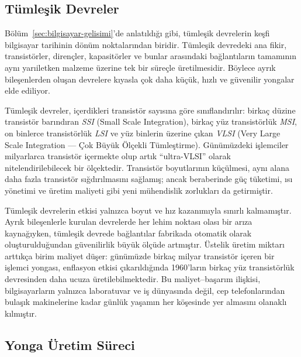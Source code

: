 \subsection{Tümleşik Devreler}
\label{sec:tumlesik-devreler}
Bölüm~\ref{sec:bilgisayar-gelisimi}'de anlatıldığı gibi, tümleşik devrelerin keşfi bilgisayar tarihinin dönüm noktalarından biridir. Tümleşik devredeki ana fikir, transistörler, dirençler, kapasitörler ve bunlar arasındaki bağlantıların tamamının aynı yarıiletken malzeme üzerine tek bir süreçle üretilmesidir. Böylece ayrık bileşenlerden oluşan devrelere kıyasla çok daha küçük, hızlı ve güvenilir yongalar elde ediliyor.

Tümleşik devreler, içerdikleri transistör sayısına göre sınıflandırılır: birkaç düzine transistör barındıran \emph{SSI} (Small Scale Integration), birkaç yüz transistörlük \emph{MSI}, on binlerce transistörlük \emph{LSI} ve yüz binlerin üzerine çıkan \emph{VLSI} (Very Large Scale Integration --- Çok Büyük Ölçekli Tümleştirme). Günümüzdeki işlemciler milyarlarca transistör içermekte olup artık ``ultra-VLSI'' olarak nitelendirilebilecek bir ölçektedir. Transistör boyutlarının küçülmesi, aynı alana daha fazla transistör sığdırılmasını sağlamış; ancak beraberinde güç tüketimi, ısı yönetimi ve üretim maliyeti gibi yeni mühendislik zorlukları da getirmiştir.

Tümleşik devrelerin etkisi yalnızca boyut ve hız kazanımıyla sınırlı kalmamıştır. Ayrık bileşenlerle kurulan devrelerde her lehim noktası olası bir arıza kaynağıyken, tümleşik devrede bağlantılar fabrikada otomatik olarak oluşturulduğundan güvenilirlik büyük ölçüde artmıştır. Üstelik üretim miktarı arttıkça birim maliyet düşer: günümüzde birkaç milyar transistör içeren bir işlemci yongası, enflasyon etkisi çıkarıldığında 1960'ların birkaç yüz transistörlük devresinden daha ucuza üretilebilmektedir. Bu maliyet--başarım ilişkisi, bilgisayarların yalnızca laboratuvar ve iş dünyasında değil, cep telefonlarından bulaşık makinelerine kadar günlük yaşamın her köşesinde yer almasını olanaklı kılmıştır.

\subsection{Yonga Üretim Süreci}
\label{sec:yonga-uretim-sureci}

